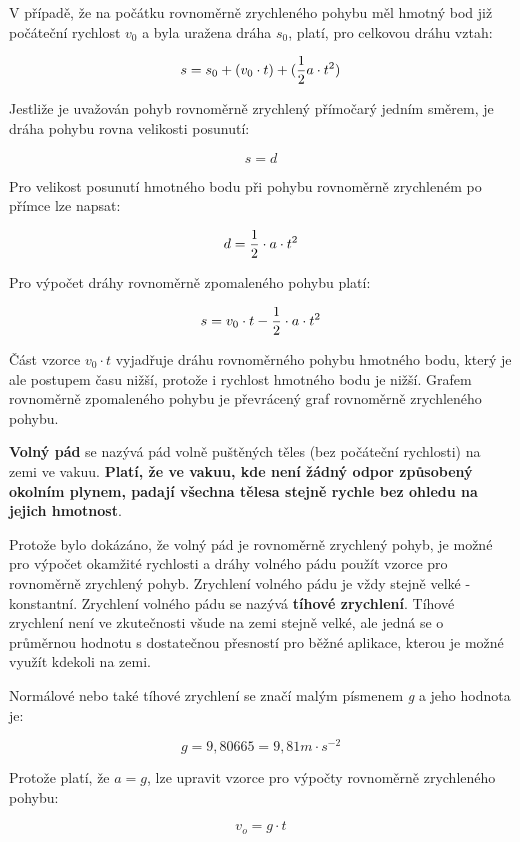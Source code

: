 \vskip 4mm
\centerline{}
\vskip 4mm

V případě, že na počátku rovnoměrně zrychleného pohybu měl hmotný bod již počáteční rychlost $v_0$ a byla uražena dráha $s_0$, platí, pro celkovou dráhu vztah:

$$s = s_0 + (v_0 \cdot t) + ({1\over 2} a\cdot t^2) $$

Jestliže je uvažován pohyb rovnoměrně zrychlený přímočarý jedním směrem, je dráha pohybu rovna velikosti posunutí:

$$ s = d $$

Pro velikost posunutí hmotného bodu při pohybu rovnoměrně zrychleném po přímce lze napsat:

$$ d = {1\over 2} \cdot a \cdot t^2 $$

Pro výpočet dráhy rovnoměrně zpomaleného pohybu platí:

$$s = v_0 \cdot t - {1\over 2} \cdot a \cdot t^2$$

Část vzorce $v_0\cdot t$ vyjadřuje dráhu rovnoměrného pohybu hmotného bodu, který je ale postupem času nižší, protože i rychlost hmotného bodu je nižší. Grafem rovnoměrně zpomaleného pohybu je převrácený graf rovnoměrně zrychleného pohybu.

\vskip 4mm
\centerline{}
\vskip 4mm


{\bf Volný pád} se nazývá pád volně puštěných těles (bez počáteční rychlosti) na zemi ve vakuu. {\bf Platí, že ve vakuu, kde není žádný odpor způsobený okolním plynem, padají všechna tělesa stejně rychle bez ohledu na jejich hmotnost}. 

Protože bylo dokázáno, že volný pád je rovnoměrně zrychlený pohyb, je možné pro výpočet okamžité rychlosti a dráhy volného pádu použít vzorce pro rovnoměrně zrychlený pohyb. Zrychlení volného pádu je vždy stejně velké - konstantní. Zrychlení volného pádu se nazývá {\bf tíhové zrychlení}. Tíhové zrychlení není ve zkutečnosti všude na zemi stejně velké, ale jedná se o průměrnou hodnotu s dostatečnou přesností pro běžné aplikace, kterou je možné využít kdekoli na zemi.

Normálové nebo také tíhové zrychlení se značí malým písmenem {\it g} a jeho hodnota je:

$$ g = 9,80665 = 9,81 m\cdot s^{-2}$$

Protože platí, že $a = g$, lze upravit vzorce pro výpočty rovnoměrně zrychleného pohybu:

$$ v_o = g \cdot t $$

